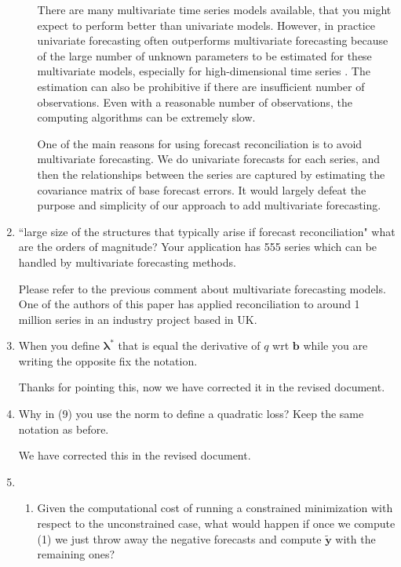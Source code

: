\documentclass[10pt,a4paper]{article}
\begin{document}
\begin{enumerate}
\begin{enumerate}
    {\color{blue} There are many multivariate time series models available, that you might expect to perform better than univariate models. However, in practice univariate forecasting often outperforms multivariate forecasting because of the large number of unknown parameters to be estimated for these multivariate models, especially for high-dimensional time series \citep{Chatfield2000}. The estimation can also be prohibitive if there are insufficient number of observations. Even with a reasonable number of observations, the computing algorithms can be extremely slow.

    One of the main reasons for using forecast reconciliation is to avoid multivariate forecasting. We do univariate forecasts for each series, and then the relationships between the series are captured by estimating the covariance matrix of base forecast errors. It would largely defeat the purpose and simplicity of our approach to add multivariate forecasting.}
  \end{enumerate}

\item
  ``large size of the structures that typically arise if forecast reconciliation" what are the orders of magnitude? Your application has 555 series which can be handled by multivariate forecasting methods.

  {\color{blue} Please refer to the previous comment about multivariate forecasting models. One of the authors of this paper has applied reconciliation to around 1 million series in an industry project based in UK.}

\item
  When you define $\bm{\lambda}^*$ that is equal the derivative of $q$ wrt $\bm{b}$ while you are writing the opposite fix the notation.

  {\color{blue} Thanks for pointing this, now we have corrected it in the revised document.}

\item
  Why in (9) you use the norm to define a quadratic loss? Keep the same notation as before.

  {\color{blue} We have corrected this in the revised document.}

\item
  \begin{enumerate}
  \item
    Given the computational cost of running a constrained minimization with respect to the unconstrained case, what would happen if once we compute (1) we just throw away the negative forecasts and compute $\tilde{\bm{y}}$ with the remaining ones?


\end{enumerate}
\end{enumerate}
\end{document}
